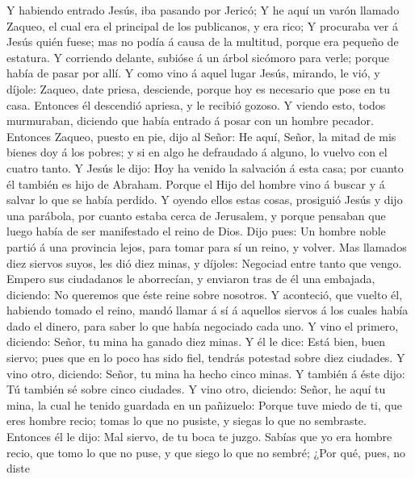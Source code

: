  Y habiendo entrado Jesús, iba pasando por Jericó;
 Y he aquí un varón llamado Zaqueo, el cual era el
principal de los publicanos, y era rico;  Y procuraba ver
á Jesús quién fuese; mas no podía á causa de la multitud, porque era
pequeño de estatura.  Y corriendo delante, subióse á un
árbol sicómoro para verle; porque había de pasar por allí.
 Y como vino á aquel lugar Jesús, mirando, le vió, y
díjole: Zaqueo, date priesa, desciende, porque hoy es necesario que pose
en tu casa.  Entonces él descendió apriesa, y le recibió
gozoso.  Y viendo esto, todos murmuraban, diciendo que
había entrado á posar con un hombre pecador.  Entonces
Zaqueo, puesto en pie, dijo al Señor: He aquí, Señor, la mitad de mis
bienes doy á los pobres; y si en algo he defraudado á alguno, lo vuelvo
con el cuatro tanto.  Y Jesús le dijo: Hoy ha venido la
salvación á esta casa; por cuanto él también es hijo de Abraham.
 Porque el Hijo del hombre vino á buscar y á salvar lo
que se había perdido.  Y oyendo ellos estas cosas,
prosiguió Jesús y dijo una parábola, por cuanto estaba cerca de
Jerusalem, y porque pensaban que luego había de ser manifestado el reino
de Dios.  Dijo pues: Un hombre noble partió á una
provincia lejos, para tomar para sí un reino, y volver. 
Mas llamados diez siervos suyos, les dió diez minas, y díjoles: Negociad
entre tanto que vengo.  Empero sus ciudadanos le
aborrecían, y enviaron tras de él una embajada, diciendo: No queremos
que éste reine sobre nosotros.  Y aconteció, que vuelto
él, habiendo tomado el reino, mandó llamar á sí á aquellos siervos á los
cuales había dado el dinero, para saber lo que había negociado cada uno.
 Y vino el primero, diciendo: Señor, tu mina ha ganado
diez minas.  Y él le dice: Está bien, buen siervo; pues
que en lo poco has sido fiel, tendrás potestad sobre diez ciudades.
 Y vino otro, diciendo: Señor, tu mina ha hecho cinco
minas.  Y también á éste dijo: Tú también sé sobre cinco
ciudades.  Y vino otro, diciendo: Señor, he aquí tu mina,
la cual he tenido guardada en un pañizuelo:  Porque tuve
miedo de ti, que eres hombre recio; tomas lo que no pusiste, y siegas lo
que no sembraste.  Entonces él le dijo: Mal siervo, de tu
boca te juzgo. Sabías que yo era hombre recio, que tomo lo que no puse,
y que siego lo que no sembré;  ¿Por qué, pues, no diste
